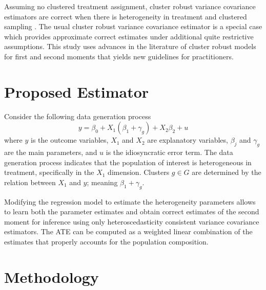 \documentclass{jbsc}
\begin{document}
Assuming no clustered treatment assignment, cluster robust variance covariance estimators are correct when there is heterogeneity in treatment and clustered sampling \citep{Abadie_Athey_Imbens_Wooldridge_2017}. The usual cluster robust variance covariance estimator is a special case which provides approximate correct estimates under additional quite restrictive assumptions. This study uses advances in the literature of cluster robust models for first and second moments that yields new guidelines for practitioners.

\section{Proposed Estimator}

Consider the following data generation process
\begin{equation}
\label{model}
y = \beta_{0} + X_{1} \left(\beta_{1} + \gamma_{g}\right) + X_{2} \beta_{2} + u
\end{equation}
where $y$ is the outcome variables, $X_{1}$ and $X_{2}$ are explanatory variables, $\beta_{j}$ and $\gamma_{g}$ are the main parameters, and $u$ is the idiosyncratic error term. The data generation process indicates that the population of interest is heterogeneous in treatment, specifically in the $X_{1}$ dimension. Clusters $g \in G$ are determined by the relation between $X_{1}$ and $y$; meaning $\beta_{1} + \gamma_{g}$.

Modifying the regression model to estimate the heterogeneity parameters allows to learn both the parameter estimates and obtain correct estimates of the second moment for inference using only heteroscedasticity consistent variance covariance estimators. The ATE can be computed as a weighted linear combination of the estimates that properly accounts for the population composition.

\section{Methodology}
\end{document}
